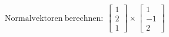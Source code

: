 \documentclass[preview]{standalone}
\begin{document}
\begin{center}
$\mathrm{Normalvektoren \: berechnen: } \:\begin{bmatrix} 1 \\ 2 \\ 1 \end{bmatrix} \times \begin{bmatrix} 1 \\ -1 \\ 2 \end{bmatrix}$
\end{center}
\end{document}
